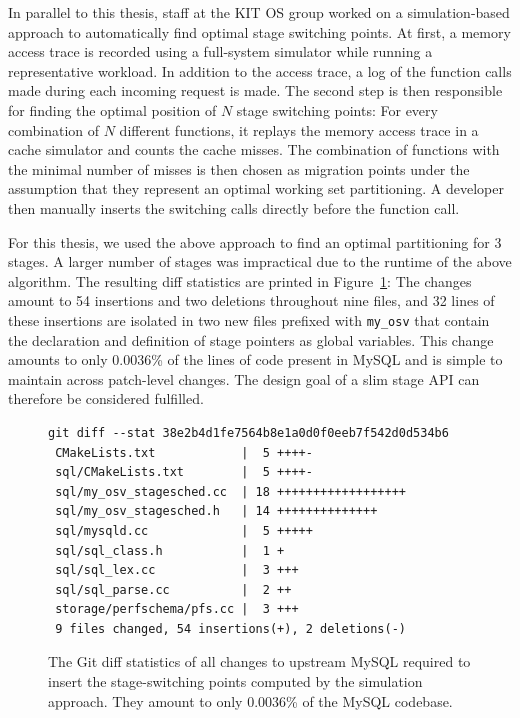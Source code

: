 \documentclass[12pt,a4paper]{book}
\begin{document}
In parallel to this thesis, staff at the KIT OS group worked on a simulation-based approach to automatically find optimal stage switching points.
At first, a memory access trace is recorded using a full-system simulator while running a representative workload.
In addition to the access trace, a log of the function calls made during each incoming request is made.
The second step is then responsible for finding the optimal position of $N$ stage switching points:
For every combination of $N$ different functions, it replays the memory access trace in a cache simulator and counts the cache misses.
The combination of functions with the minimal number of misses is then chosen as migration points under the assumption that they represent an optimal working set partitioning.
A developer then manually inserts the switching calls directly before the function call.~\cite{kitOSSFMA}

For this thesis, we used the above approach to find an optimal partitioning for 3 stages.
A larger number of stages was impractical due to the runtime of the above algorithm.
The resulting diff statistics are printed in Figure~\ref{fig:eval:api:diffstat}:
The changes amount to 54 insertions and two deletions throughout nine files, and 32 lines of these insertions are isolated in two new files prefixed with \texttt{my\_osv} that contain the declaration and definition of stage pointers as global variables.
This change amounts to only 0.0036\% of the lines of code present in MySQL and is simple to maintain across patch-level changes.
The design goal of a slim stage API can therefore be considered fulfilled.

\begin{figure}
\begin{lstlisting}[style=figurecpp]
git diff --stat 38e2b4d1fe7564b8e1a0d0f0eeb7f542d0d534b6
 CMakeLists.txt            |  5 ++++-
 sql/CMakeLists.txt        |  5 ++++-
 sql/my_osv_stagesched.cc  | 18 ++++++++++++++++++
 sql/my_osv_stagesched.h   | 14 ++++++++++++++
 sql/mysqld.cc             |  5 +++++
 sql/sql_class.h           |  1 +
 sql/sql_lex.cc            |  3 +++
 sql/sql_parse.cc          |  2 ++
 storage/perfschema/pfs.cc |  3 +++
 9 files changed, 54 insertions(+), 2 deletions(-)
\end{lstlisting}
\caption{The Git diff statistics of all changes to upstream MySQL required to insert the stage-switching points computed by the simulation approach.
    They amount to only 0.0036\% of the MySQL codebase.
}
\label{fig:eval:api:diffstat}
\end{figure}
\end{document}
